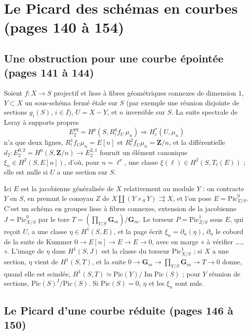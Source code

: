 \documentclass[11pt,a4paper]{article}
\begin{document}
\section*{Le Picard des schémas en courbes (pages 140 à 154)}

\subsection*{Une obstruction pour une courbe épointée (pages 141 à 144)}

Soient $f \colon X \to S$ projectif et lisse à fibres géométriques connexes de
dimension $1$, $Y \subset X$ un sous-schéma fermé étale sur $S$ (par exemple
une réunion disjointe de sections $g_i(S)$, $i \in I$), $U = X - Y$, et $n$
inversible sur $S$. La suite spectrale de Leray à supports propres
\[
E_2^{pq} = H^p(S, R^q_! f_U\, \mu_n) \Longrightarrow H^*_c(U, \mu_n)
\]
n'a que deux lignes, $R^1_! f_U\mu_n = E[n]$ et $R^2_! f_U\mu_n = \mathbf{Z}/n$,
et la différentielle $d_2 \colon E_2^{0,2} = H^0(S, \mathbf{Z}/n) \to E_2^{2,1}$
fournit un élément canonique $\xi_n \in H^2(S, E[n])$, d'où, pour $n = \ell^\nu$,
une classe $\xi(\ell) \in H^2(S, T_\ell(E))$ ; elle est nulle si $U$ a une
section sur $S$.

Ici $E$ est la jacobienne généralisée de $X$ relativement au module $Y$ : on
contracte $Y$ en $S$, en prenant le conoyau $Z$ de
$X \amalg (Y \times_S Y) \rightrightarrows X$, et l'on pose
$E = \mathrm{Pic}^0_{Z/S}$. C'est un schéma en groupes lisse à fibres
connexes, extension de la jacobienne $J = \mathrm{Pic}^0_{X/S}$ par le tore
$T = (\prod_{Y/S}\mathbf{G}_m)/\mathbf{G}_m$. Le torseur
$P = \mathrm{Pic}^1_{Z/S}$ sous $E$, qui reçoit $U$, a une classe
$\eta \in H^1(S, E)$, et la page écrit
$\xi_n = \partial_n(\eta)$, $\partial_n$ le cobord de la suite de Kummer
$0 \to E[n] \to E \to E \to 0$, avec en marge « à vérifier …… ». L'image de
$\eta$ dans $H^1(S, J)$ est la classe du torseur $\mathrm{Pic}^1_{X/S}$ ; si $X$
a une section, $\eta$ vient de $H^1(S, T)$, et la suite
$0 \to \mathbf{G}_m \to \prod_{Y/S}\mathbf{G}_m \to T \to 0$ donne, quand elle
est scindée, $H^1(S, T) \simeq \mathrm{Pic}(Y)/\operatorname{Im}\mathrm{Pic}(S)$ ;
pour $Y$ réunion de sections, $\mathrm{Pic}(S)^I/\mathrm{Pic}(S)$. Si
$\mathrm{Pic}(S) = 0$, $\eta$ et les $\xi_n$ sont nuls.

\subsection*{Le Picard d'une courbe réduite (pages 146 à 150)}
\end{document}
